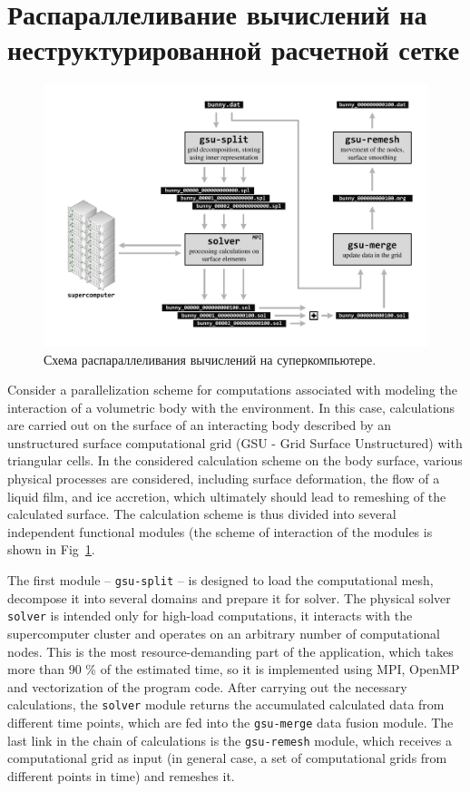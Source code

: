 \documentclass[
11pt,%
tightenlines,%
twoside,%
onecolumn,%
nofloats,%
nobibnotes,%
nofootinbib,%
superscriptaddress,%
noshowpacs,%
centertags]%
{revtex4}
\begin{document}
\section{Распараллеливание вычислений на неструктурированной расчетной сетке}

\begin{figure}[h]
\includegraphics[width=1.0\textwidth]{pics/02-scheme.pdf}
\caption{Схема распараллеливания вычислений на суперкомпьютере.}\label{fig:02-scheme}
\end{figure}

Consider a parallelization scheme for computations associated with modeling the interaction of a volumetric body with the environment.
In this case, calculations are carried out on the surface of an interacting body described by an unstructured surface computational grid (GSU - Grid Surface Unstructured) with triangular cells.
In the considered calculation scheme on the body surface, various physical processes are considered, including surface deformation, the flow of a liquid film, and ice accretion, which ultimately should lead to remeshing of the calculated surface.
The calculation scheme is thus divided into several independent functional modules (the scheme of interaction of the modules is shown in Fig~\ref{fig:02-scheme}.

The first module -- \texttt{gsu-split} -- is designed to load the computational mesh, decompose it into several domains and prepare it for solver.
The physical solver \texttt{solver} is intended only for high-load computations, it interacts with the supercomputer cluster and operates on an arbitrary number of computational nodes.
This is the most resource-demanding part of the application, which takes more than 90 \% of the estimated time, so it is implemented using MPI, OpenMP and vectorization of the program code.
After carrying out the necessary calculations, the \texttt{solver} module returns the accumulated calculated data from different time points, which are fed into the \texttt{gsu-merge} data fusion module.
The last link in the chain of calculations is the \texttt{gsu-remesh} module, which receives a computational grid as input (in general case, a set of computational grids from different points in time) and remeshes it.
\end{document}
